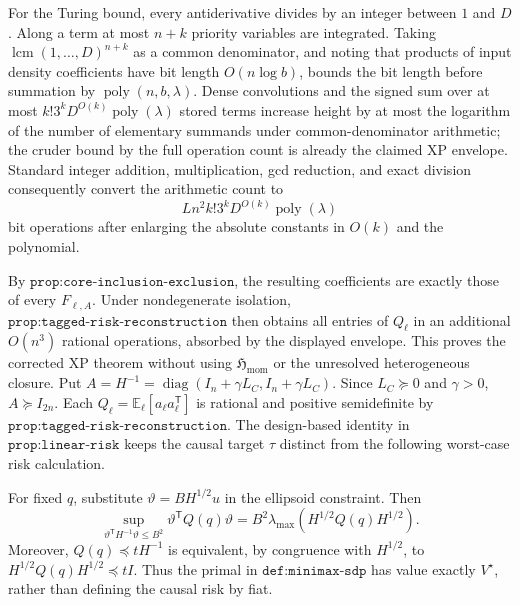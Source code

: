 For the Turing bound, every antiderivative divides by an integer between \(1\) and \(D\).  Along a term at most \(n+k\) priority variables are integrated.  Taking \(\operatorname{lcm}(1,\ldots,D)^{n+k}\) as a common denominator, and noting that products of input density coefficients have bit length \(O(n\log b)\), bounds the bit length before summation by \(\operatorname{poly}(n,b,\lambda)\).  Dense convolutions and the signed sum over at most \(k!3^kD^{O(k)}\operatorname{poly}(\lambda)\) stored terms increase height by at most the logarithm of the number of elementary summands under common-denominator arithmetic; the cruder bound by the full operation count is already the claimed XP envelope.  Standard integer addition, multiplication, gcd reduction, and exact division consequently convert the arithmetic count to
\[
 Ln^2k!3^kD^{O(k)}\operatorname{poly}(\lambda)
\]
bit operations after enlarging the absolute constants in \(O(k)\) and the polynomial.

By \(\texttt{prop:core-inclusion-exclusion}\), the resulting coefficients are exactly those of every \(F_{\ell,A}\).  Under nondegenerate isolation, \(\texttt{prop:tagged-risk-reconstruction}\) then obtains all entries of \(Q_\ell\) in an additional \(O(n^3)\) rational operations, absorbed by the displayed envelope.  This proves the corrected XP theorem without using \(\mathfrak H_{\mathrm{mom}}\) or the unresolved heterogeneous closure.
Put \(A=H^{-1}=\operatorname{diag}(I_n+\gamma L_C,I_n+\gamma L_C)\).  Since \(L_C\succeq0\) and \(\gamma>0\), \(A\succeq I_{2n}\).  Each \(Q_\ell=\mathbb E_\ell[a_\ell a_\ell^{\mathsf T}]\) is rational and positive semidefinite by \(\texttt{prop:tagged-risk-reconstruction}\).  The design-based identity in \(\texttt{prop:linear-risk}\) keeps the causal target \(\tau\) distinct from the following worst-case risk calculation.

For fixed \(q\), substitute \(\vartheta=BH^{1/2}u\) in the ellipsoid constraint.  Then
\[
 \sup_{\vartheta^{\mathsf T}H^{-1}\vartheta\le B^2}
 \vartheta^{\mathsf T}Q(q)\vartheta
 =B^2\lambda_{\max}\!\left(H^{1/2}Q(q)H^{1/2}\right).
\]
Moreover, \(Q(q)\preceq tH^{-1}\) is equivalent, by congruence with \(H^{1/2}\), to \(H^{1/2}Q(q)H^{1/2}\preceq tI\).  Thus the primal in \(\texttt{def:minimax-sdp}\) has value exactly \(V^\star\), rather than defining the causal risk by fiat.

